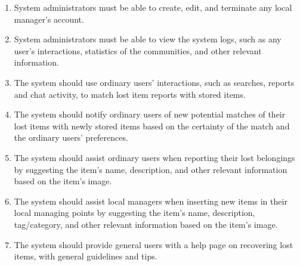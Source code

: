 \begin{enumerate}
    \item System administrators must be able to create, edit, and terminate any local manager's account.
    \item System administrators must be able to view the system logs, such as any user's interactions, statistics of the communities, and other relevant information.
    \item The system should use ordinary users' interactions, such as searches, reports and chat activity, to match lost item reports with stored items.
    \item The system should notify ordinary users of new potential matches of their lost items with newly stored items based on the certainty of the match and the ordinary users' preferences.
    \item The system should assist ordinary users when reporting their lost belongings by suggesting the item's name, description, and other relevant information based on the item's image.
    \item The system should assist local managers when inserting new items in their local managing points by suggesting the item's name, description, tag/category, and other relevant information based on the item's image.
    \item The system should provide general users with a help page on recovering lost items, with general guidelines and tips.
\end{enumerate}






